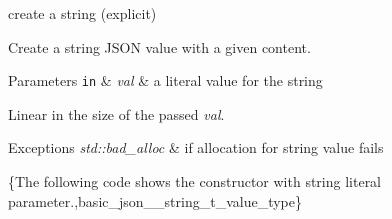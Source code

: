 create a string (explicit) 

Create a string J\-S\-O\-N value with a given content.


\begin{DoxyParams}[1]{Parameters}
\mbox{\tt in}  & {\em val} & a literal value for the string\\
\hline
\end{DoxyParams}
Linear in the size of the passed {\itshape val}.


\begin{DoxyExceptions}{Exceptions}
{\em std\-::bad\-\_\-alloc} & if allocation for string value fails\\
\hline
\end{DoxyExceptions}
\{The following code shows the constructor with string literal parameter.,basic\-\_\-json\-\_\-\-\_\-string\-\_\-t\-\_\-value\-\_\-type\}

